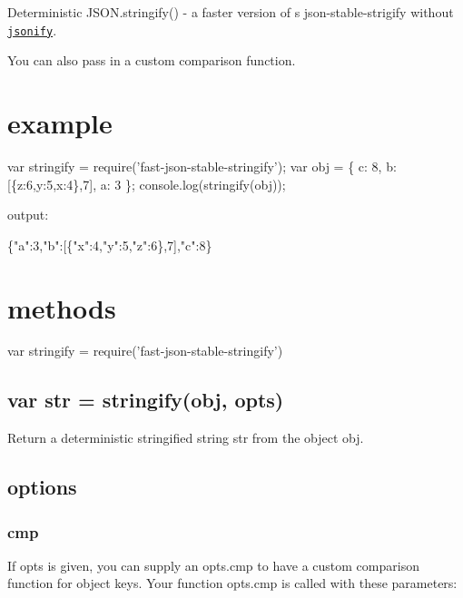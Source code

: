 Deterministic {\ttfamily J\+S\+O\+N.\+stringify()} -\/ a faster version of \href{https://github.com/substack}{\tt }\textquotesingle{}s json-\/stable-\/strigify without \href{https://github.com/substack/jsonify}{\tt jsonify}.

You can also pass in a custom comparison function.

\href{https://travis-ci.org/epoberezkin/fast-json-stable-stringify}{\tt } \href{https://coveralls.io/github/epoberezkin/fast-json-stable-stringify?branch=master}{\tt }

\section*{example}


\begin{DoxyCode}
var stringify = require('fast-json-stable-stringify');
var obj = \{ c: 8, b: [\{z:6,y:5,x:4\},7], a: 3 \};
console.log(stringify(obj));
\end{DoxyCode}


output\+:


\begin{DoxyCode}
\{"a":3,"b":[\{"x":4,"y":5,"z":6\},7],"c":8\}
\end{DoxyCode}


\section*{methods}


\begin{DoxyCode}
var stringify = require('fast-json-stable-stringify')
\end{DoxyCode}


\subsection*{var str = stringify(obj, opts)}

Return a deterministic stringified string {\ttfamily str} from the object {\ttfamily obj}.

\subsection*{options}

\subsubsection*{cmp}

If {\ttfamily opts} is given, you can supply an {\ttfamily opts.\+cmp} to have a custom comparison function for object keys. Your function {\ttfamily opts.\+cmp} is called with these parameters\+:


